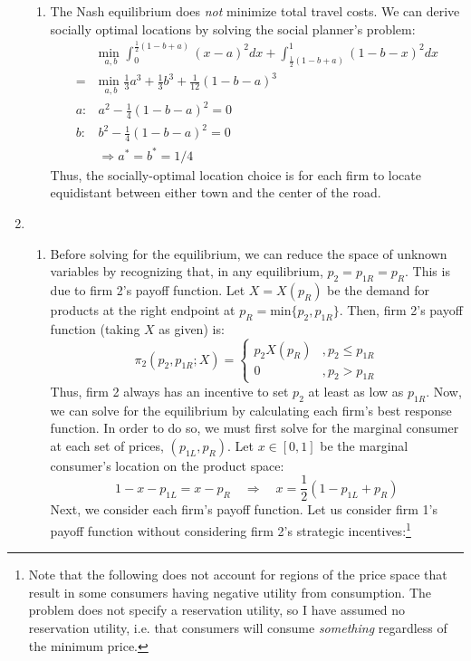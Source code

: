 \documentclass{article}
\newcommand{\usmin}[1]{\underset{#1}{\text{min }}}
\begin{document}
\begin{enumerate}
\begin{enumerate}
    \item The Nash equilibrium does \textit{not} minimize total travel costs. We can derive socially optimal locations by solving the social planner's problem:
      \begin{align*} 
          &\usmin{a,b} \int_0^{\frac{1}{2}(1-b+a)}(x-a)^2dx + \int^1_{\frac{1}{2}(1-b+a)}(1-b-x)^2dx  \\
        = &\usmin{a,b} \frac{1}{3}a^3 + \frac{1}{3}b^3 + \frac{1}{12}(1-b-a)^3                        \\
        a: & a^2 - \frac{1}{4}(1-b-a)^2 = 0                                                           \\
        b: & b^2 - \frac{1}{4}(1-b-a)^2 = 0                                                           \\
        &\Rightarrow a^*=b^*=1/4
      \end{align*}
      Thus, the socially-optimal location choice is for each firm to locate equidistant between either town and the center of the road.
  \end{enumerate}
  \pagebreak
  \item 
  \begin{enumerate}
    \item Before solving for the equilibrium, we can reduce the space of unknown variables by recognizing that, in any equilibrium, ${p_2=p_{1R}=p_R}$. This is due to firm 2's payoff function. Let ${X=X(p_R)}$ be the demand for products at the right endpoint at ${p_R=\text{min}\{p_2,p_{1R}\}}$. Then, firm 2's payoff function (taking $X$ as given) is: \[
      \pi_2(p_2,p_{1R};X) = \begin{cases}
        p_2X(p_R) &, p_2\leq p_{1R} \\
        0         &, p_2>p_{1R}
      \end{cases}
    \]
    Thus, firm 2 always has an incentive to set $p_2$ at least as low as $p_{1R}$. Now, we can solve for the equilibrium by calculating each firm's best response function. In order to do so, we must first solve for the marginal consumer at each set of prices, $(p_{1L}, p_R)$. Let $x\in[0,1]$ be the marginal consumer's location on the product space:\[
      1-x - p_{1L} = x - p_R\quad\Rightarrow\quad x= \frac{1}{2}\left(1-p_{1L}+p_R\right)
    \]
    Next, we consider each firm's payoff function. Let us consider firm 1's payoff function without considering firm 2's strategic incentives:\footnote{Note that the following does not account for regions of the price space that result in some consumers having negative utility from consumption. The problem does not specify a reservation utility, so I have assumed no reservation utility, i.e. that consumers will consume \textit{something} regardless of the minimum price.}\[
\]
\end{enumerate}
\end{enumerate}
\end{document}
